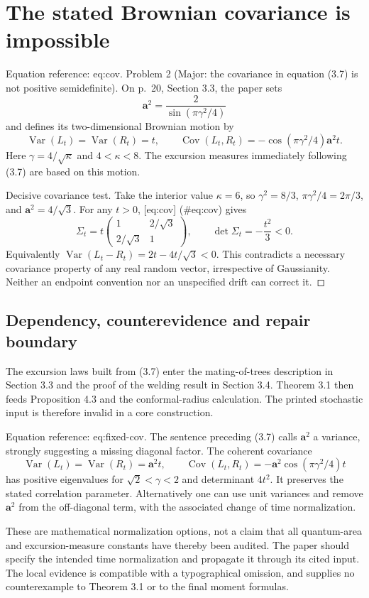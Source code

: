 \documentclass[10pt]{article}
\begin{document}
\section*{The stated Brownian covariance is impossible}
Equation reference: eq:cov. Problem 2 (Major: the covariance in equation (3.7) is not positive semidefinite).  On p. 20, Section 3.3, the paper sets \[\mathbf a^2=\frac{2}{\sin(\pi\gamma^2/4)}\] and defines its two-dimensional Brownian motion by \[
 \operatorname{Var}(L_t)=\operatorname{Var}(R_t)=t,\qquad
 \operatorname{Cov}(L_t,R_t)
 =-\cos(\pi\gamma^2/4)\mathbf a^2t .\] Here \(\gamma=4/\sqrt\kappa\) and \(4<\kappa<8\). The excursion measures immediately following (3.7) are based on this motion.\par
Decisive covariance test. Take the interior value \(\kappa=6\), so \(\gamma^2=8/3\), \(\pi\gamma^2/4=2\pi/3\), and \(\mathbf a^2=4/\sqrt3\). For any \(t>0\), [eq:cov] (\#eq:cov) gives \[\Sigma_t=t\begin{pmatrix}1&2/\sqrt3\\2/\sqrt3&1\end{pmatrix},
 \qquad
 \det\Sigma_t=-\frac{t^2}{3}<0.\] Equivalently \(\operatorname{Var}(L_t-R_t)=2t-4t/\sqrt3<0\). This contradicts a necessary covariance property of any real random vector, irrespective of Gaussianity. Neither an endpoint convention nor an unspecified drift can correct it. ◻\par
\subsection*{Dependency, counterevidence and repair boundary}
The excursion laws built from (3.7) enter the mating-of-trees description in Section 3.3 and the proof of the welding result in Section 3.4. Theorem 3.1 then feeds Proposition 4.3 and the conformal-radius calculation. The printed stochastic input is therefore invalid in a core construction.\par
Equation reference: eq:fixed-cov. The sentence preceding (3.7) calls \(\mathbf a^2\) a variance, strongly suggesting a missing diagonal factor. The coherent covariance \[
 \operatorname{Var}(L_t)=\operatorname{Var}(R_t)=\mathbf a^2t,
 \qquad
 \operatorname{Cov}(L_t,R_t)=-\mathbf a^2
       \cos(\pi\gamma^2/4)t\] has positive eigenvalues for \(\sqrt2<\gamma<2\) and determinant \(4t^2\). It preserves the stated correlation parameter. Alternatively one can use unit variances and remove \(\mathbf a^2\) from the off-diagonal term, with the associated change of time normalization.\par
These are mathematical normalization options, not a claim that all quantum-area and excursion-measure constants have thereby been audited. The paper should specify the intended time normalization and propagate it through its cited input. The local evidence is compatible with a typographical omission, and supplies no counterexample to Theorem 3.1 or to the final moment formulas.\par
\end{document}
